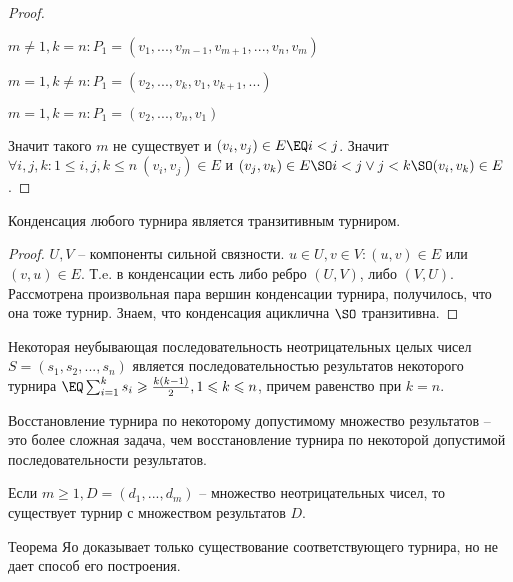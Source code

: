 \begin{proof}
		\begin{MyItemize}
			\item $m \neq 1, k = n : P_1 = (v_1, ..., v_{m - 1}, v_{m + 1}, ..., v_n, v_m)$
			\item $m = 1, k \neq n : P_1 = (v_2, ..., v_k, v_1, v_{k + 1}, ...)$
			\item $m = 1, k = n : P_1 = (v_2, ..., v_n, v_1)$ 
		\end{MyItemize}
		Значит такого $m$ не существует и $(v_i, v_j) \in E \EQ i < j$. Значит $\forall i, j, k : 1 \leqslant i, j, k \leqslant n \ (v_i, v_j) \in E$ и $(v_j, v_k) \in E \SO i < j \vee j < k \SO (v_i, v_k) \in E$. 
	\end{proof}

	\begin{Thm}
		Конденсация любого турнира является транзитивным турниром.
	\end{Thm}

	\begin{proof}
		$U, V$ -- компоненты сильной связности. $u \in U, v \in V : (u, v) \in E$ или $(v, u) \in E$. Т.e. в конденсации есть либо ребро $(U, V)$, либо $(V, U)$. 
		Рассмотрена произвольная пара вершин конденсации турнира, получилось, что она тоже турнир. Знаем, что конденсация ациклична $\SO$ транзитивна.
	\end{proof}

	\begin{Thm}[Ландау]
		Некоторая неубывающая последовательность неотрицательных целых чисел $S = (s_1, s_2, ..., s_n)$ является последовательностью результатов некоторого турнира $\EQ \sum_{i = 1}^k s_i \geqslant \frac{k(k - 1)}{2}, 1 \leqslant k \leqslant n$, причем равенство при $k = n$. 
	\end{Thm}

	\begin{Rem}
		Восстановление турнира по некоторому допустимому множество результатов  -- это более сложная задача, чем восстановление турнира по некоторой допустимой последовательности результатов.
	\end{Rem}

	\begin{Thm}[Яо]
		Если $m \geqslant 1, D = (d_1, ..., d_m)$ -- множество неотрицательных чисел, то существует турнир с множеством результатов $D$.
	\end{Thm}

	\begin{Rem}
		Теорема Яо доказывает только существование соответствующего турнира, но не дает способ его построения.
	\end{Rem}

